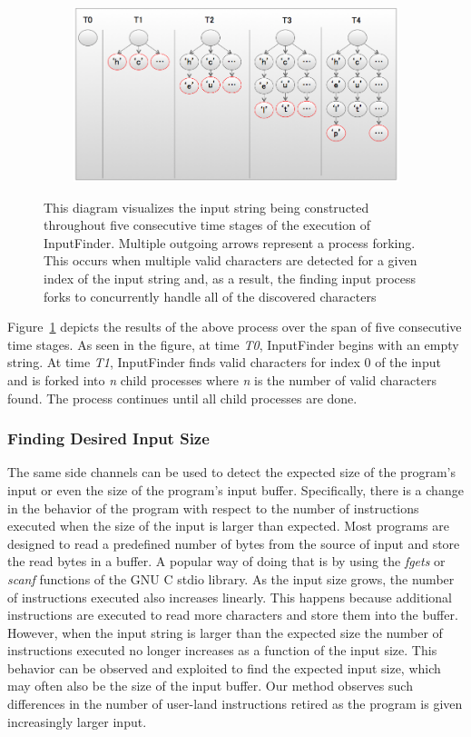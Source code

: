 \documentclass{acm_proc_article-sp}
\def \tool {InputFinder}
\begin{document}
\begin{figure}[t]
\centering
\includegraphics[height=2in,width=6.5in]{string_builder.png}
\label{fig:string_builder}
\caption{This diagram visualizes the input string being constructed throughout five consecutive time stages of the execution of \tool{}. Multiple outgoing arrows represent a process forking. This occurs when multiple valid characters are detected for a given index of the input string and, as a result, the finding input process forks to concurrently handle all of the discovered characters}
\end{figure}

Figure~\ref{fig:string_builder} depicts the results of the above process over the span of five consecutive time stages.
As seen in the figure, at time \textit{T0}, \tool{} begins with an empty string.
At time \textit{T1}, \tool{} finds valid characters for index 0 of the input and is forked into \textit{n} child processes where \textit{n} is the number of valid characters found.
The process continues until all child processes are done.

\subsubsection{Finding Desired Input Size}
The same side channels can be used to detect the expected size of the program's input or even the size of the program's input buffer.
Specifically, there is a change in the behavior of the program with respect to the number of instructions executed when the size of the input is larger than expected.
Most programs are designed to read a predefined number of bytes from the source of input and store the read bytes in a buffer.
A popular way of doing that is by using the \textit{fgets} or \textit{scanf} functions of the GNU C stdio library.
As the input size grows, the number of instructions executed also increases linearly.
This happens because additional instructions are executed to read more characters and store them into the buffer.
However, when the input string is larger than the expected size the number of instructions executed no longer increases as a function of the input size.
This behavior can be observed and exploited to find the expected input size, which may often also be the size of the input buffer.
Our method observes such differences in the number of user-land instructions retired as the program is given increasingly larger input.
\end{document}
